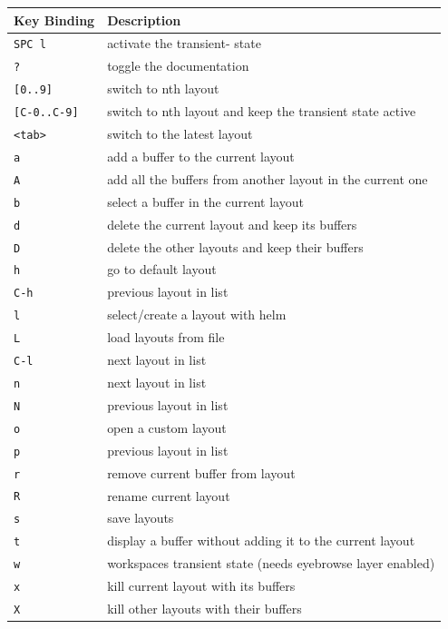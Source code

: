 \documentclass[11pt]{article}
\begin{document}
\begin{center}
\begin{tabular}{ll}
Key Binding & Description\\
\hline
\texttt{SPC l} & activate the transient- state\\
\texttt{?} & toggle the documentation\\
\texttt{[0..9]} & switch to nth layout\\
\texttt{[C-0..C-9]} & switch to nth layout and keep the transient state active\\
\texttt{<tab>} & switch to the latest layout\\
\texttt{a} & add a buffer to the current layout\\
\texttt{A} & add all the buffers from another layout in the current one\\
\texttt{b} & select a buffer in the current layout\\
\texttt{d} & delete the current layout and keep its buffers\\
\texttt{D} & delete the other layouts and keep their buffers\\
\texttt{h} & go to default layout\\
\texttt{C-h} & previous layout in list\\
\texttt{l} & select/create a layout with helm\\
\texttt{L} & load layouts from file\\
\texttt{C-l} & next layout in list\\
\texttt{n} & next layout in list\\
\texttt{N} & previous layout in list\\
\texttt{o} & open a custom layout\\
\texttt{p} & previous layout in list\\
\texttt{r} & remove current buffer from layout\\
\texttt{R} & rename current layout\\
\texttt{s} & save layouts\\
\texttt{t} & display a buffer without adding it to the current layout\\
\texttt{w} & workspaces transient state (needs eyebrowse layer enabled)\\
\texttt{x} & kill current layout with its buffers\\
\texttt{X} & kill other layouts with their buffers\\
\end{tabular}
\end{center}
\end{document}
